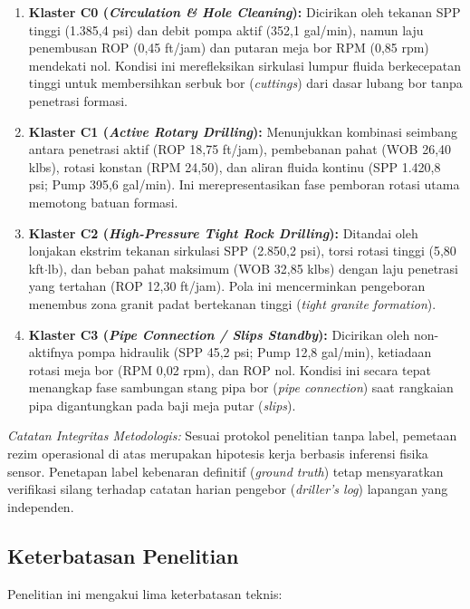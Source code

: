 \documentclass[conference]{IEEEtran}
\begin{document}
\begin{enumerate}
\item \textbf{Klaster C0 (\textit{Circulation \& Hole Cleaning}):} Dicirikan oleh tekanan SPP tinggi (1.385,4 psi) dan debit pompa aktif (352,1 gal/min), namun laju penembusan ROP (0,45 ft/jam) dan putaran meja bor RPM (0,85 rpm) mendekati nol. Kondisi ini merefleksikan sirkulasi lumpur fluida berkecepatan tinggi untuk membersihkan serbuk bor (\textit{cuttings}) dari dasar lubang bor tanpa penetrasi formasi.

\item \textbf{Klaster C1 (\textit{Active Rotary Drilling}):} Menunjukkan kombinasi seimbang antara penetrasi aktif (ROP 18,75 ft/jam), pembebanan pahat (WOB 26,40 klbs), rotasi konstan (RPM 24,50), dan aliran fluida kontinu (SPP 1.420,8 psi; Pump 395,6 gal/min). Ini merepresentasikan fase pemboran rotasi utama memotong batuan formasi.

\item \textbf{Klaster C2 (\textit{High-Pressure Tight Rock Drilling}):} Ditandai oleh lonjakan ekstrim tekanan sirkulasi SPP (2.850,2 psi), torsi rotasi tinggi (5,80 kft$\cdot$lb), dan beban pahat maksimum (WOB 32,85 klbs) dengan laju penetrasi yang tertahan (ROP 12,30 ft/jam). Pola ini mencerminkan pengeboran menembus zona granit padat bertekanan tinggi (\textit{tight granite formation}).

\item \textbf{Klaster C3 (\textit{Pipe Connection / Slips Standby}):} Dicirikan oleh non-aktifnya pompa hidraulik (SPP 45,2 psi; Pump 12,8 gal/min), ketiadaan rotasi meja bor (RPM 0,02 rpm), dan ROP nol. Kondisi ini secara tepat menangkap fase sambungan stang pipa bor (\textit{pipe connection}) saat rangkaian pipa digantungkan pada baji meja putar (\textit{slips}).
\end{enumerate}

\noindent\textit{Catatan Integritas Metodologis:} Sesuai protokol penelitian tanpa label, pemetaan rezim operasional di atas merupakan hipotesis kerja berbasis inferensi fisika sensor. Penetapan label kebenaran definitif (\textit{ground truth}) tetap mensyaratkan verifikasi silang terhadap catatan harian pengebor (\textit{driller's log}) lapangan yang independen.

\subsection{Keterbatasan Penelitian}
Penelitian ini mengakui lima keterbatasan teknis:
\end{document}
